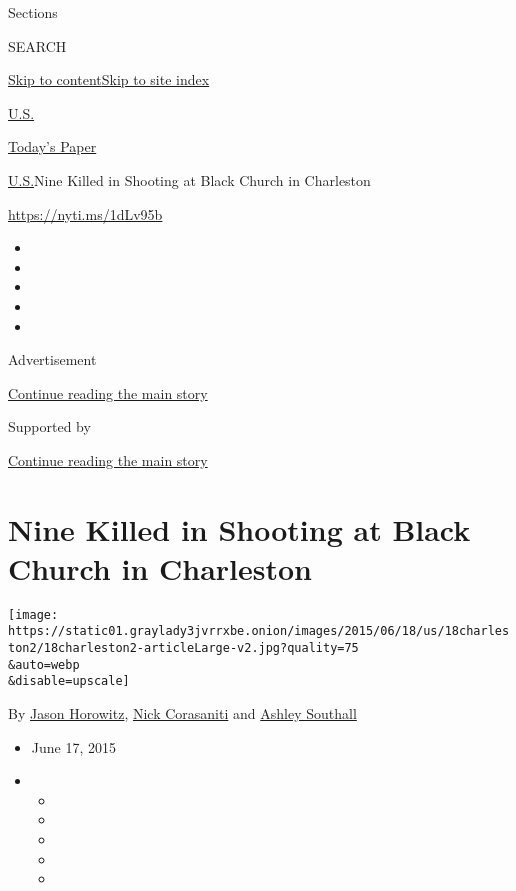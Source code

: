 Sections

SEARCH

\protect\hyperlink{site-content}{Skip to
content}\protect\hyperlink{site-index}{Skip to site index}

\href{https://www.nytimes3xbfgragh.onion/section/us}{U.S.}

\href{https://myaccount.nytimes3xbfgragh.onion/auth/login?response_type=cookie\&client_id=vi}{}

\href{https://www.nytimes3xbfgragh.onion/section/todayspaper}{Today's
Paper}

\href{/section/us}{U.S.}\textbar{}Nine Killed in Shooting at Black
Church in Charleston

\url{https://nyti.ms/1dLv95b}

\begin{itemize}
\item
\item
\item
\item
\item
\end{itemize}

Advertisement

\protect\hyperlink{after-top}{Continue reading the main story}

Supported by

\protect\hyperlink{after-sponsor}{Continue reading the main story}

\hypertarget{nine-killed-in-shooting-at-black-church-in-charleston}{%
\section{Nine Killed in Shooting at Black Church in
Charleston}\label{nine-killed-in-shooting-at-black-church-in-charleston}}

\texttt{[image: https://static01.graylady3jvrrxbe.onion/images/2015/06/18/us/18charleston2/18charleston2-articleLarge-v2.jpg?quality=75\\\&auto=webp\\\&disable=upscale]}

By \href{https://www.nytimes3xbfgragh.onion/by/jason-horowitz}{Jason
Horowitz},
\href{http://www.nytimes3xbfgragh.onion/by/nick-corasaniti}{Nick
Corasaniti} and
\href{https://www.nytimes3xbfgragh.onion/by/ashley-southall}{Ashley
Southall}

\begin{itemize}
\item
  June 17, 2015
\item
  \begin{itemize}
  \item
  \item
  \item
  \item
  \item
  \end{itemize}
\end{itemize}

